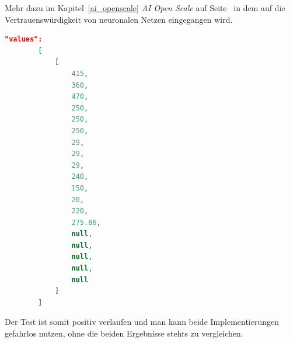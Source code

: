 Mehr dazu im Kapitel~\ref{ai_openscale} \textit{AI Open Scale} auf Seite~\pageref{ai_openscale} in dem auf die 
Vertrauenswürdigkeit von neuronalen Netzen eingegangen wird.

\begin{lstlisting}[language=JSON, caption=Parameter zum Test der beiden Implementierungen, label=ls:umsetzung_parameter]
    "values":
        [
            [
                415,
                360,
                470,
                250,
                250,
                250,
                29,
                29,
                29,
                240,
                150,
                20,
                220,
                275.86,
                null,
                null,
                null,
                null,
                null
            ]
        ]
\end{lstlisting}

Der Test ist somit positiv verlaufen und man kann beide Implementierungen gefahrlos nutzen, ohne die beiden Ergebnisse
stehts zu vergleichen.